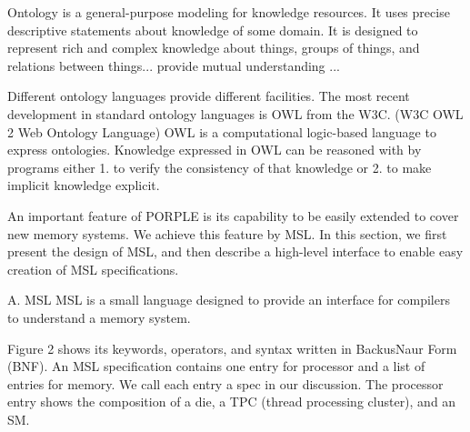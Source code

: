 \documentclass{sig-alternate}
\begin{document}
Ontology \cite{ontology1, ontology2} is a general-purpose modeling for knowledge resources. It uses precise descriptive statements about knowledge of some domain. It is designed to represent rich and complex knowledge about things, groups of things, and relations between things... provide mutual understanding ... 

Different ontology languages provide different facilities. The most recent development in standard ontology languages is OWL from the W3C. (W3C OWL 2 Web Ontology Language)
OWL is a computational logic-based language to express ontologies. Knowledge expressed in OWL can be reasoned with by programs either 1. to verify the consistency of that knowledge or 2. to make implicit knowledge explicit.





An important feature of PORPLE is its capability to be easily extended to cover new memory systems. We achieve this feature by MSL. In this section, we first present the design of MSL, and then describe a high-level interface to enable easy creation of MSL specifications.

A. MSL
MSL is a small language designed to provide an interface for compilers to understand a memory system.

Figure 2 shows its keywords, operators, and syntax written in BackusNaur Form (BNF). An MSL specification contains one entry for processor and a list of entries for memory. We call each entry a spec in our discussion. The processor entry shows the composition of a die, a TPC (thread processing cluster), and an SM.
\end{document}
